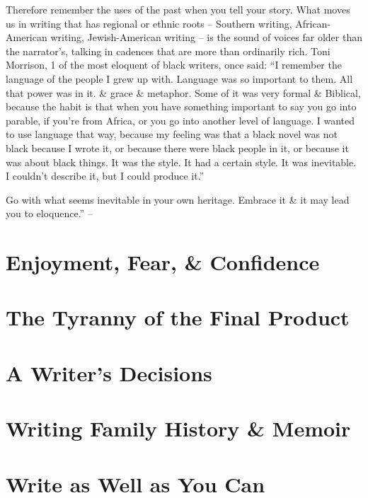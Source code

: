 \documentclass{article}
\numberwithin{equation}{section}
\begin{document}
Therefore remember the uses of the past when you tell your story. What moves us in writing that has regional or ethnic roots -- Southern writing, African-American writing, Jewish-American writing -- is the sound of voices far older than the narrator's, talking in cadences that are more than ordinarily rich. Toni Morrison, 1 of the most eloquent of black writers, once said: ``I remember the language of the people I grew up with. Language was so important to them. All that power was in it. \& grace \& metaphor. Some of it was very formal \& Biblical, because the habit is that when you have something important to say you go into parable, if you're from Africa, or you go into another level of language. I wanted to use language that way, because my feeling was that a black novel was not black because I wrote it, or because there were black people in it, or because it was about black things. It was the style. It had a certain style. It was inevitable. I couldn't describe it, but I could produce it.''

Go with what seems inevitable in your own heritage. Embrace it \& it may lead you to eloquence.'' -- \cite[pp. 217--225]{Zinsser2016}


\section{Enjoyment, Fear, \& Confidence}


\section{The Tyranny of the Final Product}


\section{A Writer's Decisions}


\section{Writing Family History \& Memoir}


\section{Write as Well as You Can}


\printbibliography[heading=bibintoc]
	
\end{document}
